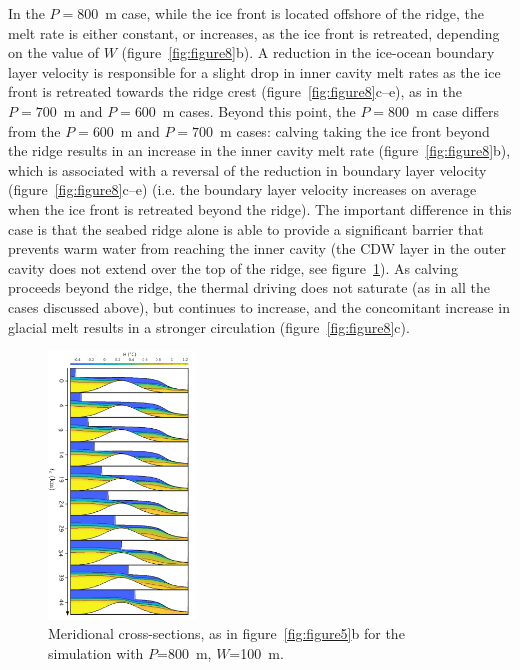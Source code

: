 \documentclass[draft]{agujournal2019}
\begin{document}
In the $P=800$~m case, while the ice front is located offshore of the ridge, the melt rate is either constant, or increases, as the ice front is retreated, depending on the value of $W$ (figure~\ref{fig:figure8}b). A reduction in the ice-ocean boundary layer velocity is responsible for a slight drop in inner cavity melt rates as the ice front is retreated towards the ridge crest (figure~\ref{fig:figure8}c--e), as in the $P=700$~m and $P=600$~m cases. Beyond this point, the $P=800$~m case differs from the $P = 600$~m and $P = 700$~m cases: calving taking the ice front beyond the ridge results in an increase in the inner cavity melt rate (figure~\ref{fig:figure8}b), which is associated with a reversal of the reduction in boundary layer velocity (figure~\ref{fig:figure8}c--e) (i.e. the boundary layer velocity increases on average when the ice front is retreated beyond the ridge). The important difference in this case is that the seabed ridge alone is able to provide a significant barrier that prevents warm water from reaching the inner cavity (the CDW layer in the outer cavity does not extend over the top of the ridge, see figure~\ref{fig:figure9}). As calving proceeds beyond the ridge, the thermal driving does not saturate (as in all the cases discussed above), but continues to increase, and the concomitant increase in glacial melt results in a stronger circulation (figure~\ref{fig:figure8}c).

\begin{figure}
    \centering
    \includegraphics[width = 0.35\textwidth]{../make_figures/plots/figure9.pdf}
    \caption{Meridional cross-sections, as in figure~\ref{fig:figure5}b for the simulation with $P$=800~m, $W$=100~m. }
    \label{fig:figure9}
\end{figure}
\end{document}
